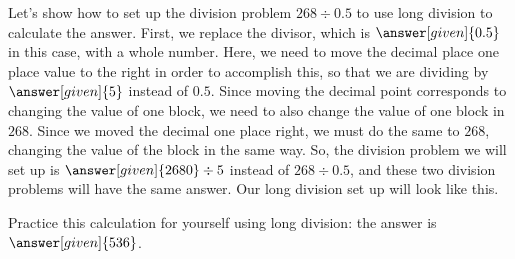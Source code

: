 \documentclass{ximera}
\begin{document}
\begin{example}
Let's show how to set up the division problem $268 \div 0.5$ to use long division to calculate the answer. First, we replace the divisor, which is $\answer[given]{0.5}$ in this case, with a whole number. Here, we need to move the decimal place one place value to the right in order to accomplish this, so that we are dividing by $\answer[given]{5}$ instead of $0.5$. Since moving the decimal point corresponds to changing the value of one block, we need to also change the value of one block in $268$. Since we moved the decimal one place right, we must do the same to $268$, changing the value of the block in the same way. So, the division problem we will set up is $\answer[given]{2680} \div 5$ instead of $268 \div 0.5$, and these two division problems will have the same answer. Our long division set up will look like this.
\begin{image}
\end{image}

Practice this calculation for yourself using long division: the answer is $\answer[given]{536}$.
\end{example}
\end{document}
